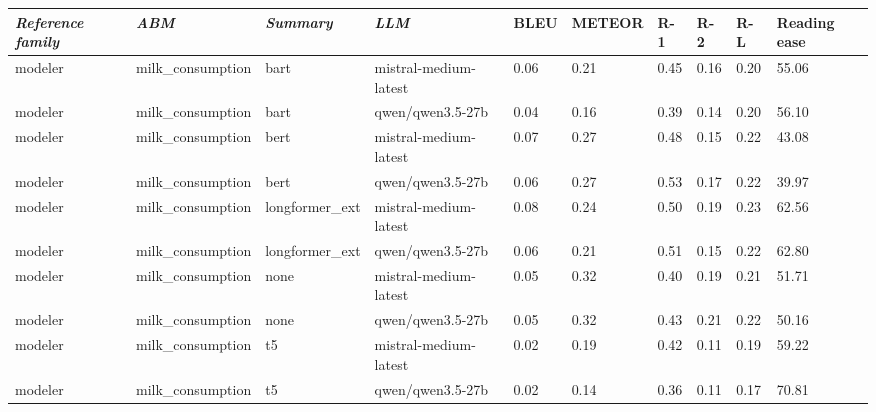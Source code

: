 \begin{tabular}{|l|l|l|l|l|l|l|l|l|l|}
\hline
\textit{\textbf{Reference family}} & \textit{\textbf{ABM}} & \textit{\textbf{Summary}} & \textit{\textbf{LLM}} & BLEU & METEOR & R-1 & R-2 & R-L & Reading ease \\
 \hline
 modeler & milk\_consumption & bart & mistral-medium-latest & 0.06 & 0.21 & 0.45 & 0.16 & 0.20 & 55.06 \\
 \hline
 modeler & milk\_consumption & bart & qwen/qwen3.5-27b & 0.04 & 0.16 & 0.39 & 0.14 & 0.20 & 56.10 \\
 \hline
 modeler & milk\_consumption & bert & mistral-medium-latest & 0.07 & 0.27 & 0.48 & 0.15 & 0.22 & 43.08 \\
 \hline
 modeler & milk\_consumption & bert & qwen/qwen3.5-27b & 0.06 & 0.27 & 0.53 & 0.17 & 0.22 & 39.97 \\
 \hline
 modeler & milk\_consumption & longformer\_ext & mistral-medium-latest & 0.08 & 0.24 & 0.50 & 0.19 & 0.23 & 62.56 \\
 \hline
 modeler & milk\_consumption & longformer\_ext & qwen/qwen3.5-27b & 0.06 & 0.21 & 0.51 & 0.15 & 0.22 & 62.80 \\
 \hline
 modeler & milk\_consumption & none & mistral-medium-latest & 0.05 & 0.32 & 0.40 & 0.19 & 0.21 & 51.71 \\
 \hline
 modeler & milk\_consumption & none & qwen/qwen3.5-27b & 0.05 & 0.32 & 0.43 & 0.21 & 0.22 & 50.16 \\
 \hline
 modeler & milk\_consumption & t5 & mistral-medium-latest & 0.02 & 0.19 & 0.42 & 0.11 & 0.19 & 59.22 \\
 \hline
 modeler & milk\_consumption & t5 & qwen/qwen3.5-27b & 0.02 & 0.14 & 0.36 & 0.11 & 0.17 & 70.81 \\
\hline
\end{tabular}
